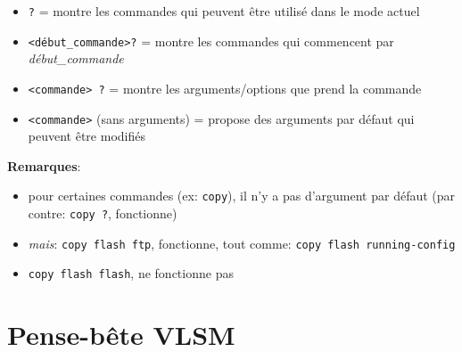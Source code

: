 \documentclass[a4paper]{article}
\begin{document}
\begin{itemize}
    \item \texttt{?} = montre les commandes qui peuvent être utilisé dans le mode actuel
    \item \texttt{<début\_commande>?} = montre les commandes qui commencent par \textit{début\_commande}
    \item \texttt{<commande> ?} = montre les arguments/options que prend la commande
    \item \texttt{<commande>} (sans arguments) = propose des arguments par défaut qui peuvent être modifiés
\end{itemize}
\textbf{Remarques}:
\begin{itemize}
    \item pour certaines commandes (ex: \texttt{copy}), il n'y a pas d'argument par défaut (par contre: \texttt{copy ?}, fonctionne)
    \item \textit{mais}: \texttt{copy flash ftp}, fonctionne, tout comme: \texttt{copy flash running-config}
    \item \texttt{copy flash flash}, ne fonctionne pas
\end{itemize}










\section{Pense-bête VLSM}
\end{document}

